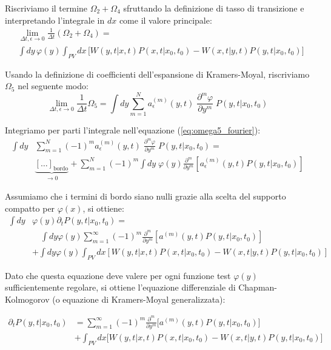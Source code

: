 Riscriviamo il termine $\Omega_2 + \Omega_4$ sfruttando la definizione di tasso di transizione e interpretando l'integrale in $dx$ come il valore principale:
\begin{align}
&\lim_{\Delta t, \epsilon \to 0} \frac{1}{\Delta t} ( \Omega_2 + \Omega_4) = \nonumber \\ &\int dy \, \varphi(y) \int_{PV} dx \, \Biggl[ W(y,t|x,t) P(x, t | x_0, t_0)- W(x,t|y,t)P(y, t | x_0, t_0) \Biggr]
\end{align}

Usando la definizione di coefficienti dell'espansione di Kramers-Moyal, riscriviamo $\Omega_5$ nel seguente modo:
\begin{equation}
\lim_{\Delta t, \epsilon \to 0} \frac{1}{\Delta t} \Omega_5 = \int dy \sum_{m=1}^{N}  a^{(m)}_{\epsilon}(y,t)  \;\frac{\partial^m \varphi}{\partial y^m} \; P(y,t|x_0,t_0)
\label{eq:omega5_fourier}
\end{equation}

Integriamo per parti l'integrale nell'equazione (\ref{eq:omega5_fourier}):
\begin{align}
\int dy & \sum_{m=1}^{N} (-1)^m  a^{(m)}_{\epsilon}(y,t)  \;\frac{\partial^m \varphi}{\partial y^m} \; P(y,t|x_0,t_0)  =\\ & \underbrace{[\dots]_{\text{bordo}}}_{\to 0} + \sum_{m=1}^{N} (-1)^m \int dy \; \varphi(y) \frac{\partial^m }{\partial y^m} \left[a^{(m)}_{\epsilon}(y,t)  P(y,t|x_0,t_0)   \right] \nonumber
\end{align}

Assumiamo che i termini di bordo siano nulli grazie alla scelta del supporto compatto per $\varphi(x)$, si ottiene:
\begin{align}
\int dy &\varphi(y) \partial_t P(y,t|x_0,t_0) = \nonumber \\ & \quad \int dy \varphi(y) \sum_{m=1}^{\infty} (-1)^m \frac{\partial^m}{\partial y^m} [a^{(m)}(y,t) P(y,t|x_0,t_0)] \nonumber\\ &  +\int dy \varphi(y) \int_{PV} dx [W(y,t|x,t)P(x,t|x_0,t_0) - W(x,t|y,t)P(y,t|x_0,t_0)] \end{align}

Dato che questa equazione deve valere per ogni funzione test $\varphi(y)$ sufficientemente regolare, si ottiene l'equazione differenziale di Chapman-Kolmogorov (o equazione di Kramers-Moyal generalizzata):
\begin{tcolorbox}[
    colback=colorA!5,      
    colframe=colorA,       
    arc=3mm,               
    boxrule=1.2pt
]
\begin{equation*} 
\begin{aligned}
\partial_t P(y,t|x_0,t_0) &= \sum_{m=1}^{\infty} (-1)^m \frac{\partial^m}{\partial y^m} \biggl[a^{(m)}(y,t) P(y,t|x_0,t_0)\biggr] \\ &+\int_{PV} dx \Biggl [W(y,t|x,t)P(x,t|x_0,t_0) - W(x,t|y,t)P(y,t|x_0,t_0) \Biggr] 
\end{aligned} 
\end{equation*}
\end{tcolorbox}

